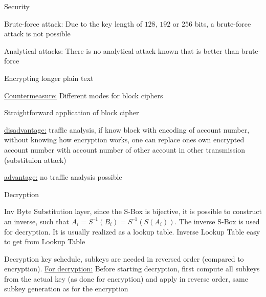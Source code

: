 \documentclass[landscape, a4paper]{article}
\begin{document}
\begin{minipage}[t]{0.19\pagewidth}
\begin{betterlist}
\begin{betterlist}
\begin{betterlist}
\begin{betterlist}
				\end{betterlist}
			\end{betterlist}
			\begin{betterlist}
				\item Security
				\begin{betterlist}
					\item \alert{Brute-force attack:} Due to the key length of $128$, $192$ or $256$ bits, a brute-force attack is not possible
					\item \alert{Analytical attacks:} There is no analytical attack known that is better than brute-force
				\end{betterlist}
				\begin{betterlist}
					\item Encrypting longer plain text
					\begin{betterlist}
						\item \underline{Countermeasure:} Different modes for block ciphers
						\begin{betterlist}
							\item Straightforward application of block cipher
							\item \underline{disadvantage:} \alert{traffic analysis}, if know block with encoding of account number, without knowing how encryption works, one can replace ones own encrypted account number with account number of other account in other transmission (\alert{substituion attack})
						\end{betterlist}
						\begin{betterlist}
							\item \underline{advantage:} no \alert{traffic analysis} possible
						\end{betterlist}
					\end{betterlist}
				\end{betterlist}
			\end{betterlist}
			\begin{betterlist}
				\item Decryption
				\begin{betterlist}
					\item \alert{Inv Byte Substitution layer}, since the S-Box is bijective, it is possible to construct an inverse, such that $A_i = S^{–1}(B_i) = S^{–1}(S(A_i))$. The inverse S-Box is used for decryption. It is usually realized as a lookup table. Inverse Lookup Table easy to get from Lookup Table
					\item \alert{Decryption key schedule}, subkeys are needed in reversed order (compared to encryption). \underline{For decryption:} Before starting decryption, first compute all subkeys from the actual key (as done for encryption) and apply in reverse order, same subkey generation as for the encryption

\end{betterlist}
\end{betterlist}
\end{betterlist}
\end{betterlist}
\end{minipage}
\end{document}
